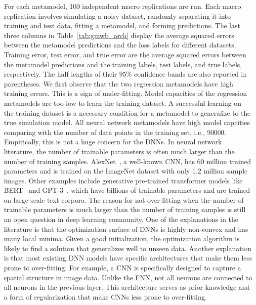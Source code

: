 For each metamodel, \num{100} independent macro replications are run.
Each macro replication involves simulating a noisy dataset, randomly separating it into training and test data, fitting a metamodel, and forming predictions.
The last three columns in Table~\ref{tab:gmwb_arch} display the average squared errors between the metamodel predictions and the loss labels for different datasets.
Training error, test error, and true error are the average squared errors between the metamodel predictions and the training labels, test labels, and true labels, respectively.
The half lengths of their $95\%$ confidence bands are also reported in parentheses.
We first observe that the two regression metamodels have high training errors.
This is a sign of under-fitting.
Model capacities of the regression metamodels are too low to learn the training dataset.
A successful learning on the training dataset is a necessary condition for a metamodel to generalize to the true simulation model.
All neural network metamodels have high model capcities comparing with the number of data points in the training set, i.e., $\num{90000}$.
Empirically, this is not a huge concern for the DNNs.
In neural network literature, the number of trainable parameters is often much larger than the number of training samples.
AlexNet~\citep{krizhevsky2012imagenet}, a well-known CNN, has $\num{60}$ million trained parameters and is trained on the ImageNet dataset with only $1.2$ million sample images.
Other examples include generative pre-trained transformer models like BERT~\citep{devlin2018bert} and GPT-3~\citep{brown2020language}, which have billions of trainable parameters and are trained on large-scale text corpora.
The reason for not over-fitting when the number of trainable parameters is much larger than the number of training samples is still an open question in deep learning community.
One of the explanations in the literature is that the optimization surface of DNNs is highly non-convex and has many local minima.
Given a good initialization, the optimization algorithm is likely to find a solution that generalizes well to unseen data.
Another explanation is that most existing DNN models have specific architectures that make them less prone to over-fitting.
For example, a CNN is specifically designed to capture a spatial structure in image data.
Unlike the FNN, not all neurons are connected to all neurons in the previous layer.
This architecture serves as prior knowledge and a form of regularization that make CNNs less prone to over-fitting.

